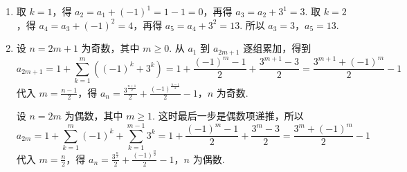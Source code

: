\begin{solution}
\begin{enumerate}
\item 取 \(k=1\)，得 \(a_2=a_1+(-1)^1=1-1=0\)，再得 \(a_3=a_2+3^1=3\). 取 \(k=2\)，得 \(a_4=a_3+(-1)^2=4\)，再得 \(a_5=a_4+3^2=13\). 所以 \(a_3=3\)，\(a_5=13\).

\item 设 \(n=2m+1\) 为奇数，其中 \(m\geqslant0\). 从 \(a_1\) 到 \(a_{2m+1}\) 逐组累加，得到
\[
a_{2m+1}=1+\sum_{k=1}^{m}\left((-1)^k+3^k\right)=1+\frac{(-1)^m-1}{2}+\frac{3^{m+1}-3}{2}=\frac{3^{m+1}+(-1)^m}{2}-1
\]
代入 \(m=\frac{n-1}{2}\)，得
\(a_n=\frac{3^{\frac{n+1}{2}}}{2}+\frac{(-1)^{\frac{n-1}{2}}}{2}-1\)，\(n\text{ 为奇数}\).

设 \(n=2m\) 为偶数，其中 \(m\geqslant1\). 这时最后一步是偶数项递推，所以
\[
a_{2m}=1+\sum_{k=1}^{m}(-1)^k+\sum_{k=1}^{m-1}3^k=1+\frac{(-1)^m-1}{2}+\frac{3^m-3}{2}=\frac{3^m+(-1)^m}{2}-1
\]
代入 \(m=\frac n2\)，得
\(a_n=\frac{3^{\frac n2}}{2}+\frac{(-1)^{\frac n2}}{2}-1\)，\(n\text{ 为偶数}\).
\end{enumerate}
\end{solution}
